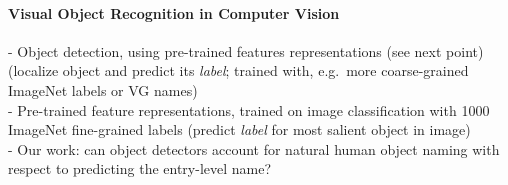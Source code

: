 



\paragraph{Visual Object Recognition in Computer Vision}
- Object detection, using pre-trained features representations (see next point) (localize object and predict its \textit{label}; trained with, e.g.\ more coarse-grained ImageNet labels or VG names)\\
- Pre-trained feature representations, trained on image classification with 1000 ImageNet fine-grained labels (predict \textit{label} for most salient object in image)\\
- Our work: can object detectors account for natural human object naming with respect to predicting the entry-level name? 
